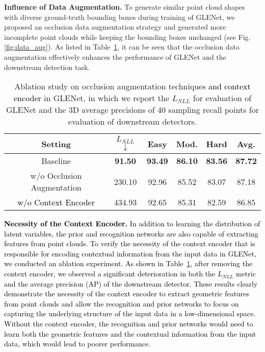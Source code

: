 \documentclass[twocolumn]{svjour3}
\newcommand{\revise}[1]{\textcolor{black}{#1}}
\begin{document}
\noindent\textbf{Influence of Data Augmentation.} To generate similar point cloud shapes with diverse ground-truth bounding boxes during training of GLENet, we proposed an occlusion data augmentation strategy and generated more incomplete point clouds while keeping the bounding boxes unchanged (see Fig. \ref{fig:data_aug}).
As listed in Table~\ref{table:data_aug}, it can be seen that the occlusion data augmentation effectively enhances the performance of GLENet and the downstream detection task.\\ 


\setlength{\tabcolsep}{2.8pt}
\begin{table}
	\centering
	\caption{Ablation study on occlusion augmentation techniques \revise{and context encoder} in GLENet, in which we report the $L_{NLL}$ for evaluation of GLENet and the 3D average precisions of 40 sampling recall points for evaluation of downstream detectors.}
	\label{table:data_aug}
	\begin{tabular}{c|c|cccc} 
		\toprule
		Setting                    & $L_{NLL}$$\downarrow$ & Easy  & Mod.  & Hard  & Avg.   \\ 
		\hline
		Baseline                   & \textbf{91.50}  & \textbf{93.49} & \textbf{86.10} & \textbf{83.56} & \textbf{87.72}  \\
		w/o Occlusion Augmentation & 230.10 & 92.96 & 85.52 & 83.07 & 87.18  \\
		\revise{w/o Context Encoder}        & 434.93 & 92.65 & 85.31 & 82.59 & 86.85  \\
		\bottomrule
	\end{tabular}
\end{table}

\setlength{\tabcolsep}{1.5pt}

\noindent
\revise{
	\textbf{Necessity of the Context Encoder.} 
In addition to learning the distribution of latent variables, the prior and recognition networks are also capable of extracting features from point clouds.
	To verify the necessity of the context encoder that is responsible for encoding contextual information from the input data in GLENet, we conducted an ablation experiment. 
As shown in Table~\ref{table:data_aug}, after removing the context encoder, we observed a significant deterioration in both the $L_{NLL}$ metric and the average precision (AP) of the downstream detector. 
	These results clearly demonstrate the necessity of the context encoder to extract geometric features from point clouds and allow the recognition and prior networks to focus on capturing the underlying structure of the input data in a low-dimensional space. Without the context encoder, the recognition and prior networks would need to learn both the geometric features and the contextual information from the input data, which would lead to poorer performance.
}\\
\end{document}

